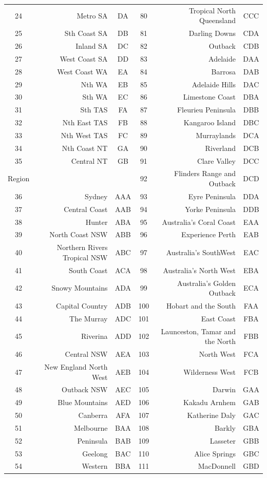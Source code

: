 \documentclass[11pt,a4paper,]{article}
\begin{document}
\begin{table}[t]
\begin{tabular}{crccrc}
24 & Metro SA & DA & 80 & Tropical North Queensland & CCC\\
25 & Sth Coast SA & DB & 81 & Darling Downs & CDA\\
26 & Inland SA & DC & 82 & Outback & CDB\\
27 & West Coast SA & DD & 83 & Adelaide & DAA\\
28 & West Coast WA & EA & 84 & Barrosa & DAB\\
29 & Nth WA & EB & 85 & Adelaide Hills & DAC\\
30 & Sth WA & EC & 86 & Limestone Coast & DBA\\
31 & Sth TAS & FA & 87 & Fleurieu Peninsula & DBB\\
32 & Nth East TAS & FB & 88 & Kangaroo Island & DBC\\
33 & Nth West TAS & FC & 89 & Murraylands & DCA\\
34 & Nth Coast NT & GA & 90 & Riverland & DCB\\
35 & Central NT & GB & 91 & Clare Valley & DCC\\
Region &  &  & 92 & Flinders Range and Outback & DCD\\
36 & Sydney & AAA & 93 & Eyre Peninsula & DDA\\
37 & Central Coast & AAB & 94 & Yorke Peninsula & DDB\\
38 & Hunter & ABA & 95 & Australia's Coral Coast & EAA\\
39 & North Coast NSW & ABB & 96 & Experience Perth & EAB\\
40 & Northern Rivers Tropical NSW & ABC & 97 & Australia's SouthWest & EAC\\
41 & South Coast & ACA & 98 & Australia's North West & EBA\\
42 & Snowy Mountains & ADA & 99 & Australia's Golden Outback & ECA\\
43 & Capital Country & ADB & 100 & Hobart and the South & FAA\\
44 & The Murray & ADC & 101 & East Coast & FBA\\
45 & Riverina & ADD & 102 & Launceston, Tamar and the North & FBB\\
46 & Central NSW & AEA & 103 & North West & FCA\\
47 & New England North West & AEB & 104 & Wilderness West & FCB\\
48 & Outback NSW & AEC & 105 & Darwin & GAA\\
49 & Blue Mountains & AED & 106 & Kakadu Arnhem & GAB\\
50 & Canberra & AFA & 107 & Katherine Daly & GAC\\
51 & Melbourne & BAA & 108 & Barkly & GBA\\
52 & Peninsula & BAB & 109 & Lasseter & GBB\\
53 & Geelong & BAC & 110 & Alice Springs & GBC\\
54 & Western & BBA & 111 & MacDonnell & GBD\\
\bottomrule
\end{tabular}
\end{table}
\end{document}
